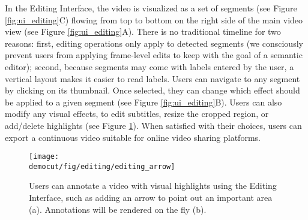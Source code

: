 In the Editing Interface, the video is visualized as a set of segments (see Figure \ref{fig:ui_editing}C) flowing from top to bottom on the right side of the main video view (see Figure \ref{fig:ui_editing}A). There is no traditional timeline for two reasons: first, editing operations only apply to detected segments (we consciously prevent users from applying frame-level edits to keep with the goal of a semantic editor); second, because segments may come with labels entered by the user, a vertical layout makes it easier to read labels. Users can navigate to any segment by clicking on its thumbnail. Once selected, they can change which effect should be applied to a given segment (see Figure \ref{fig:ui_editing}B). Users can also modify any visual effects, to edit subtitles, resize the cropped region, or add/delete highlights (see Figure \ref{fig:editing_arrow}). When satisfied with their choices, users can export a continuous video suitable for online video sharing platforms.

\begin{figure}[b!]
  \centering
  \texttt{[image: \\democut/fig/editing/editing\_arrow]}
  \caption{Users can annotate a video with visual highlights using the Editing Interface, such as adding an arrow to point out an important area (a). Annotations will be rendered on the fly (b).}
  \label{fig:editing_arrow}
\end{figure}
